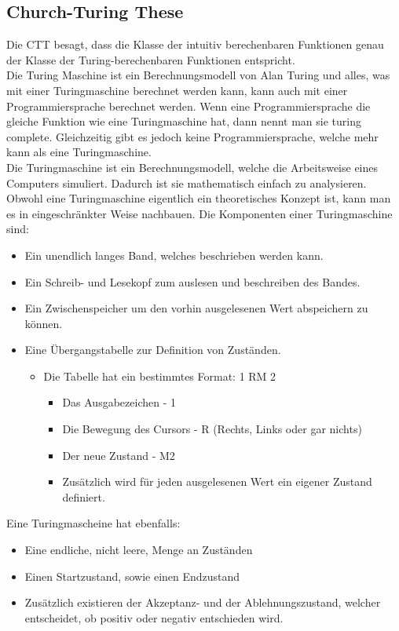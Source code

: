 \documentclass{article}
\begin{document}
	\subsection{Church-Turing These}
	Die CTT besagt, dass die Klasse der intuitiv berechenbaren Funktionen genau der Klasse der Turing-berechenbaren Funktionen entspricht. \\
	Die Turing Maschine ist ein Berechnungsmodell von Alan Turing und alles, was mit einer Turingmaschine berechnet werden kann, kann auch mit einer Programmiersprache berechnet werden. Wenn eine Programmiersprache die gleiche Funktion wie eine Turingmaschine hat, dann nennt man sie turing complete. Gleichzeitig gibt es jedoch keine Programmiersprache, welche mehr kann als eine Turingmaschine. \\
	Die Turingmaschine ist ein Berechnungsmodell, welche die Arbeitsweise eines Computers simuliert. Dadurch ist sie mathematisch einfach zu analysieren. Obwohl eine Turingmaschine eigentlich ein theoretisches Konzept ist, kann man es in eingeschränkter Weise nachbauen. Die Komponenten einer Turingmaschine sind:
	\begin{itemize}
		\item{Ein unendlich langes Band, welches beschrieben werden kann.}
		\item{Ein Schreib- und Lesekopf zum auslesen und beschreiben des Bandes.}
		\item{Ein Zwischenspeicher um den vorhin ausgelesenen Wert abspeichern zu können.}
		\item{Eine Übergangstabelle zur Definition von Zuständen.}
		\begin{itemize}
			\item{Die Tabelle hat ein bestimmtes Format: 1 RM 2}
			\begin{itemize}
				\item{Das Ausgabezeichen - 1}
				\item{Die Bewegung des Cursors - R (Rechts, Links oder gar nichts)}
				\item{Der neue Zustand - M2}
				\item{Zusätzlich wird für jeden ausgelesenen Wert ein eigener Zustand definiert.}
			\end{itemize}
		\end{itemize}
	\end{itemize}
	Eine Turingmascheine hat ebenfalls:
	\begin{itemize}
		\item{Eine endliche, nicht leere, Menge an Zuständen}
		\item{Einen Startzustand, sowie einen Endzustand}
		\item{Zusätzlich existieren der Akzeptanz- und der Ablehnungszustand, welcher entscheidet, ob positiv oder negativ entschieden wird.}
	\end{itemize}
\end{document}
